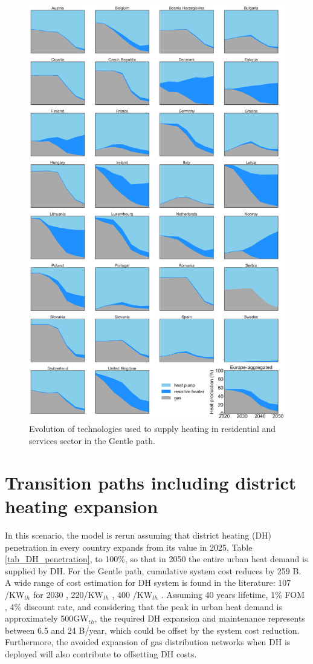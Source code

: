 \documentclass[3p]{elsarticle} %
\begin{document}
\begin{figure}[!h]
\centering
\includegraphics[width=0.8\columnwidth]{figures/heat_production_w_TYNDP_go_oldversion.png}
\caption{Evolution of technologies used to supply heating in residential and services sector in the Gentle path. } \label{fig_heating_shares} 
\end{figure}

\FloatBarrier

\section{Transition paths including district heating expansion} \label{sec_DH_exp}

In this scenario, the model is rerun assuming that district heating (DH) penetration in every country expands from its value in 2025, Table \ref{tab_DH_penetration}, to 100\%, so that in 2050 the entire urban heat demand is supplied by DH.
For the Gentle path, cumulative system cost reduces by 259 B\EUR. A wide range of cost estimation for DH system is found in the literature: 107 \EUR/KW$_{th}$ for 2030 \cite{in-depth-data}, 220\EUR/KW$_{th}$ \cite{Gerhardt_2015}, 400 \EUR/KW$_{th}$ \cite{Sterchele_2020}. Assuming 40 years lifetime, 1\% FOM \cite{Sterchele_2020}, 4\% discount rate,  and considering that the peak in urban heat demand is approximately 500GW$_{th}$, the required DH expansion and maintenance represents between 6.5 and 24 B\EUR/year, which could be offset by the system cost reduction.  Furthermore, the avoided expansion of gas distribution networks when DH is deployed will also contribute to offsetting DH costs. 
\end{document}
